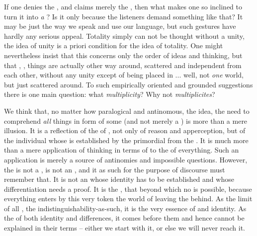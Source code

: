 If one denies the , and claims merely the , then what makes one so inclined to turn it into {\em a}
?  Is it only because the listeners demand something like that? It
may be just the way we speak and use our language, but such 
gestures have hardly any serious appeal.  Totality simply can not be thought
without a unity, the idea of unity is a priori condition for the idea of
totality. One might nevertheless insist that this concerns only the order of
ideas and thinking, but that , , things are
actually other way around, scattered and independent from each other, without
any unity except of being placed in ... well, not {\em one} world, but just
scattered around. To such empirically oriented and grounded suggestions there is
one main question: what {\em multiplicity}? Why not {\em multiplicites}? 

\pa
We think that, no matter how paralogical and antinomous, the idea, the need to
comprehend {\em all} things in form of some  (and not merely a
) is more than a mere illusion.
It is a reflection %
of the  of , not only of reason and 
apperception, but of the individual  whose  is
established by the primordial  from the .  It is much
more than a mere application of  thinking in terms of
 to the  of everything.  Such an
application is merely a source of antinomies and impossible questions.  However,
the  is not a , is not an , and 
 it as such for the purpose of discourse must remember that.  It is
not an  whose identity has to be established and whose
differentiation needs a proof.  It is the , that beyond which no
 is possible, because everything  enters by
this very token the world of  leaving the 
behind. As the limit of all , the indistinguishability-as-such,
it is the very essence of  and identity.  As the  of both
identity and differences, it comes before them and hence cannot be explained in
their terms -- either we start with it, or else we will never reach it.


